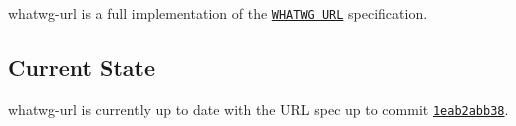 whatwg-\/url is a full implementation of the \href{https://url.spec.whatwg.org/}{\tt W\+H\+A\+T\+WG U\+RL} specification.

\subsection*{Current State}

whatwg-\/url is currently up to date with the U\+RL spec up to commit \href{https://github.com/whatwg/url/tree/1eab2abb3806158fc7a550ac5b7deb2d6fff5602}{\tt 1eab2abb38}. 